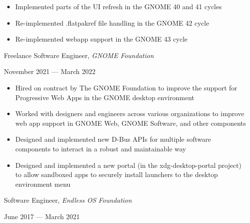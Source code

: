 \documentclass[11pt]{article}
\begin{document}
\begin{itemize}
  \item Implemented parts of the UI refresh in the GNOME 40 and 41 cycles
  \item Re-implemented .flatpakref file handling in the GNOME 42 cycle
  \item Re-implemented webapp support in the GNOME 43 cycle
\end{itemize}

\begin{minipage}[t]{0.65\textwidth}
\flushleft
Freelance Software Engineer, \textit{GNOME Foundation}\\
\end{minipage}
\begin{minipage}[t]{0.30\textwidth}
\flushright
November 2021 --- March 2022\\
\end{minipage}

\begin{itemize}
  \item Hired on contract by The GNOME Foundation to improve the support for Progressive Web Apps in the GNOME desktop environment
  \item Worked with designers and engineers across various organizations to improve web app support in GNOME Web, GNOME Software, and other components
  \item Designed and implemented new D-Bus APIs for multiple software components to interact in a robust and maintainable way
  \item Designed and implemented a new portal (in the xdg-desktop-portal project) to allow sandboxed apps to securely install launchers to the desktop environment menu
\end{itemize}

\begin{minipage}[t]{0.65\textwidth}
\flushleft
Software Engineer, \textit{Endless OS Foundation}\\
\end{minipage}
\begin{minipage}[t]{0.30\textwidth}
\flushright
June 2017 --- March 2021\\
\end{minipage}
\end{document}
